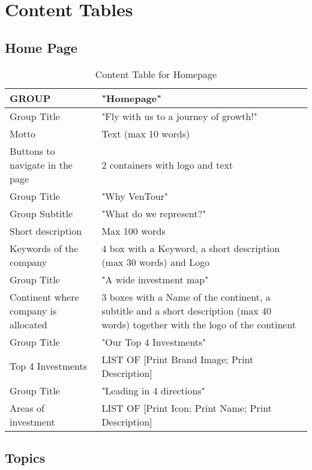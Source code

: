 \documentclass[../../DD.tex]{subfiles}
\begin{document}
\section{Content Tables}
\subsection{Home Page}
 \begin{table}[h]
    \begin{tabular}{ |l|p{}| }
    \hline
    GROUP & "Homepage"\\
    \hline
    Group Title & "Fly with us to a journey of growth!" \\
    \hline
    Motto & Text (max 10 words) \\
    \hline
    Buttons to navigate in the page & 2 containers with logo and text\\
    \hline
    Group Title & "Why VenTour" \\
    \hline
    Group Subtitle & "What do we represent?" \\
    \hline
    Short description & Max 100 words \\
    \hline
    Keywords of the company & 4 box with a Keyword, a short description (max 30 words) and Logo \\
    \hline
    Group Title & "A wide investment map" \\
    \hline
    Continent where company is allocated & 3 boxes with a Name of the continent, a subtitle and a short description (max 40 words) together with the logo of the continent \\
    \hline
    Group Title & "Our Top 4 Investments" \\
    \hline
    Top 4 Investments & LIST OF [Print Brand Image; Print Description] \\
    \hline
    Group Title & "Leading in 4 directions" \\
    \hline
    Areas of investment & LIST OF [Print Icon; Print Name; Print Description] \\
    \hline
\end{tabular}
\caption{Content Table for Homepage}
\end{table}  

\subsection{Topics}
\end{document}
